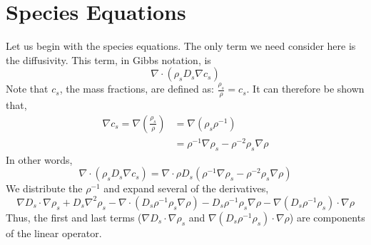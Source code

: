 \documentclass[10pt]{article}
\begin{document}
\section{Species Equations}
Let us begin with the species equations. The only term we need consider here is the diffusivity. 
This term, in Gibbs notation, is 
\begin{equation}
  \nabla \cdot (\rho_s D_s \nabla c_s)
\end{equation}
Note that $c_s$, the mass fractions, are defined as: $\frac{\rho_s}{\rho} = c_s$. 
It can therefore be shown that, 
\begin{eqnarray}
  \nabla c_s = \nabla (\frac{\rho_s}{\rho}) &= \nabla (\rho_s \rho^{-1})\\
             &= \rho^{-1} \nabla \rho_s - \rho^{-2} \rho_s \nabla \rho
\end{eqnarray}
In other words, 
\begin{equation}
  \nabla \cdot (\rho_s D_s \nabla c_s) = \nabla \cdot \rho D_s (\rho^{-1} \nabla \rho_s - \rho^{-2} \rho_s \nabla \rho)
\end{equation}
We distribute the $\rho^{-1}$ and expand several of the derivatives,
\begin{equation}
  \nabla D_s \cdot \nabla \rho_s + D_s \nabla^2 \rho_s - \nabla \cdot (D_s \rho^{-1} \rho_s \nabla \rho) - D_s \rho^{-1} \rho_s \nabla \rho - \nabla(D_s \rho^{-1} \rho_s) \cdot \nabla \rho
\end{equation}
Thus, the first and last terms ($\nabla D_s \cdot \nabla \rho_s$ and $\nabla(D_s \rho^{-1} \rho_s) \cdot \nabla \rho$) are components of the linear operator. 
\end{document}
